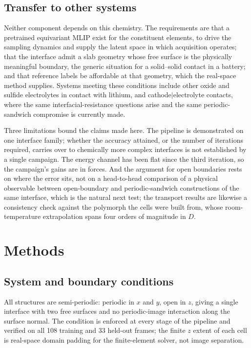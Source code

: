 \documentclass[11pt]{article}
\begin{document}
\subsection*{Transfer to other systems}
\label{sec:general}

Neither component depends on this chemistry. The requirements are that a
pretrained equivariant MLIP exist for the constituent elements, to drive the
sampling dynamics and supply the latent space in which acquisition operates;
that the interface admit a slab geometry whose free surface is the physically
meaningful boundary, the generic situation for a solid--solid contact in a
battery; and that reference labels be affordable at that geometry, which the
real-space method supplies. Systems meeting these conditions include other oxide
and sulfide electrolytes in contact with lithium, and cathode$|$electrolyte
contacts, where the same interfacial-resistance questions arise and the same
periodic-sandwich compromise is currently made.

Three limitations bound the claims made here. The pipeline is demonstrated on
one interface family; whether the accuracy attained, or the number of iterations
required, carries over to chemically more complex interfaces is not established
by a single campaign. The energy channel has been flat since the third
iteration, so the campaign's gains are in forces. And the argument for open
boundaries rests on where the error sits, not on a head-to-head comparison of a
physical observable between open-boundary and periodic-sandwich constructions of
the same interface, which is the natural next test; the transport results are
likewise a consistency check against the polymorph the cells were built from,
whose room-temperature extrapolation spans four orders of magnitude in $D$.

\section{Methods}

\subsection{System and boundary conditions}
All structures are semi-periodic: periodic in $x$ and $y$, open in $z$, giving a
single interface with two free surfaces and no periodic-image interaction along
the surface normal\citep{dftfe,Das2022}. The condition is enforced at every stage
of the pipeline and verified on all 108 training and 33 held-out frames; the
finite $z$ extent of each cell is real-space domain padding for the
finite-element solver, not image separation.
\end{document}
